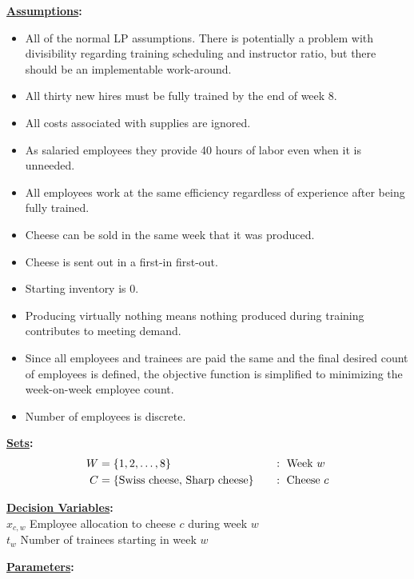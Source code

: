 \documentclass[12pt]{amsart}
\begin{document}
\bigskip\bigskip

\textbf{\underline{Assumptions}:}
\begin{itemize}
	\item All of the normal LP assumptions. 
	There is potentially a problem with divisibility regarding training scheduling and instructor ratio,
	but there should be an implementable work-around. 
	\item All thirty new hires must be fully trained by the end of week 8.
	\item All costs associated with supplies are ignored.
	\item As salaried employees they provide 40 hours of labor even when it is unneeded.
	\item All employees work at the same efficiency regardless of experience after being fully trained.
	\item Cheese can be sold in the same week that it was produced.
	\item Cheese is sent out in a first-in first-out.
	\item Starting inventory is 0.
	\item Producing virtually nothing means nothing produced during training contributes to meeting demand.
	\item Since all employees and trainees are paid the same and the final desired count of employees is defined, 
	the objective function is simplified to minimizing the week-on-week employee count.
	\item Number of employees is discrete.
\end{itemize}


\textbf{\underline{Sets}:}
\begin{align*}
	W &= \{1,2,\ldots,8\}\hspace{19ex} & &:\  \text{Week } w \\
	C &= \{\text{Swiss cheese},\, \text{Sharp cheese}\}\ & &:\  \text{Cheese } c
\end{align*}

\textbf{\underline{Decision Variables}:} \\ 

\noindent
\(x_{c,w}\) Employee allocation to cheese \(c\) during week \(w\) \\
\(t_w\) Number of trainees starting in week \(w\) \\

\clearpage

\textbf{\underline{Parameters}:} \\
\end{document}
